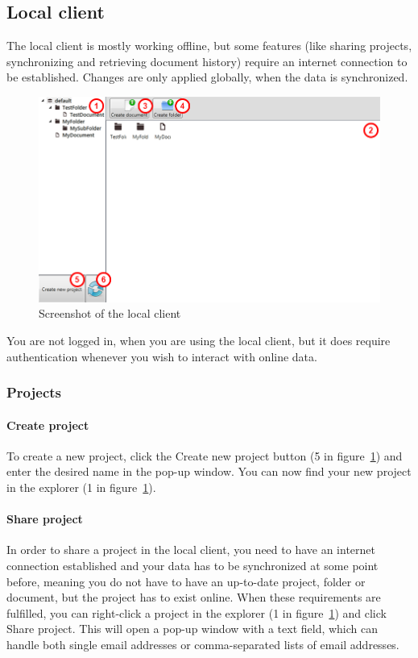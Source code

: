 \subsection{Local client}

The local client is mostly working offline, but some features (like sharing projects, synchronizing and retrieving document history) require an
internet connection to be established. Changes are only applied globally, when the data is synchronized.

\begin{figure}[htb]
	\centering
	\includegraphics[width=1\textwidth]{User_manual/graphics/local.png}
	\caption{Screenshot of the local client}
	\label{fig:manual-local}
\end{figure}

You are not logged in, when you are using the local client, but it does require authentication whenever you wish to interact with online data.

\subsubsection{Projects}

	\paragraph{Create project}
	To create a new project, click the Create new project button (5 in figure~\ref{fig:manual-local}) and enter the desired name in the pop-up window. You can now find your new project in the explorer (1 in figure~\ref{fig:manual-local}).

	\paragraph{Share project}
	In order to share a project in the local client, you need to have an internet connection established and your data
    has to be synchronized at some point before, meaning you do not have to have an up-to-date project, folder or
    document, but the project has to exist online. When these requirements are fulfilled, you can right-click a project
    in the explorer (1 in figure~\ref{fig:manual-local}) and click Share project. This will open a pop-up window with
    a text field, which can handle both single email addresses or comma-separated lists of email addresses.

